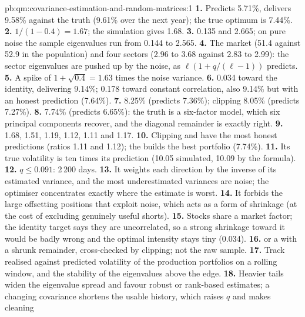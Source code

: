 \begin{solution}{pb:qm:covariance-estimation-and-random-matrices:1}
\textbf{1.} Predicts 5.71\%, delivers 9.58\% against the truth (9.61\% over the next year); the true optimum is 7.44\%.
\textbf{2.} $1/(1 - 0.4) = 1.67$; the simulation gives 1.68.
\textbf{3.} 0.135 and 2.665; on pure noise the sample eigenvalues run from 0.144 to 2.565.
\textbf{4.} The market (51.4 against 52.9 in the population) and four sectors (2.96 to 3.68 against 2.83 to 2.99): the sector eigenvalues are pushed up by the noise, as
$\ell(1 + q/(\ell - 1))$ predicts.
\textbf{5.} A spike of $1 + \sqrt{0.4} = 1.63$ times the noise variance.
\textbf{6.} 0.034 toward the identity, delivering 9.14\%; 0.178 toward constant correlation, also 9.14\% but with an honest prediction (7.64\%).
\textbf{7.}  8.25\% (predicts 7.36\%); clipping 8.05\% (predicts 7.27\%).
\textbf{8.} 7.74\% (predicts 6.65\%): the truth is a six-factor model, which six principal components recover, and the diagonal remainder is exactly right.
\textbf{9.} 1.68, 1.51, 1.19, 1.12, 1.11 and 1.17.
\textbf{10.} Clipping and  have the most honest predictions (ratios 1.11 and 1.12); the  builds the best portfolio (7.74\%).
\textbf{11.} Its true volatility is ten times its prediction (10.05 simulated, 10.09 by the formula).
\textbf{12.} $q \le 0.091$: 2\,200 days.
\textbf{13.} It weights each direction by the inverse of its estimated variance, and the most underestimated variances are noise; the optimiser concentrates exactly where the estimate is
worst.
\textbf{14.} It forbids the large offsetting positions that exploit noise, which acts as a form of shrinkage (at the cost of excluding genuinely useful shorts).
\textbf{15.} Stocks share a market factor; the identity target says they are uncorrelated, so a strong shrinkage toward it would be badly wrong and the optimal intensity stays tiny (0.034).
\textbf{16.}  or a  with a shrunk remainder, cross-checked by clipping; not the raw sample.
\textbf{17.} Track realised against predicted volatility of the production portfolios on a rolling window, and the stability of the eigenvalues above the edge.
\textbf{18.} Heavier tails widen the eigenvalue spread and favour robust or rank-based estimates; a changing covariance shortens the usable history, which raises $q$ and makes cleaning

\end{solution}
